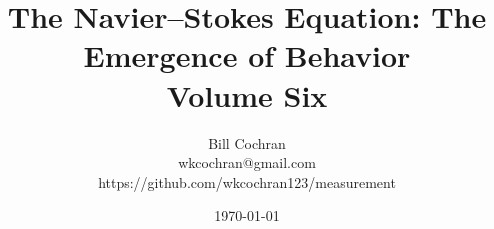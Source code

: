 \documentclass[12pt,oneside]{book}
\begin{document}
\title{The Navier--Stokes Equation: The Emergence of Behavior\\
\large Volume Six}

\author{Bill Cochran\\wkcochran@gmail.com\\https://github.com/wkcochran123/measurement}
\date{\today}

\maketitle

\tableofcontents









\end{document}
